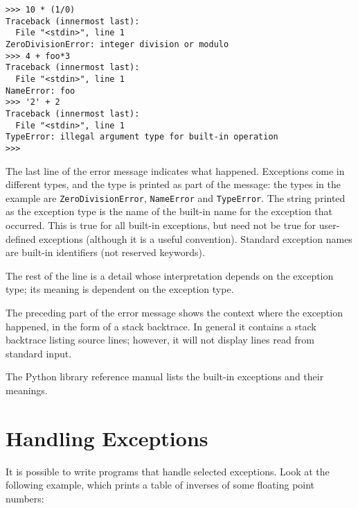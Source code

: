 \bcode\small\begin{verbatim}
>>> 10 * (1/0)
Traceback (innermost last):
  File "<stdin>", line 1
ZeroDivisionError: integer division or modulo
>>> 4 + foo*3
Traceback (innermost last):
  File "<stdin>", line 1
NameError: foo
>>> '2' + 2
Traceback (innermost last):
  File "<stdin>", line 1
TypeError: illegal argument type for built-in operation
>>> 
\end{verbatim}\ecode
%
The last line of the error message indicates what happened.
Exceptions come in different types, and the type is printed as part of
the message: the types in the example are
{\tt ZeroDivisionError},
{\tt NameError}
and
{\tt TypeError}.
The string printed as the exception type is the name of the built-in
name for the exception that occurred.  This is true for all built-in
exceptions, but need not be true for user-defined exceptions (although
it is a useful convention).
Standard exception names are built-in identifiers (not reserved
keywords).

The rest of the line is a detail whose interpretation depends on the
exception type; its meaning is dependent on the exception type.

The preceding part of the error message shows the context where the
exception happened, in the form of a stack backtrace.
In general it contains a stack backtrace listing source lines; however,
it will not display lines read from standard input.

The Python library reference manual lists the built-in exceptions and
their meanings.

\section{Handling Exceptions}

It is possible to write programs that handle selected exceptions.
Look at the following example, which prints a table of inverses of
some floating point numbers:

